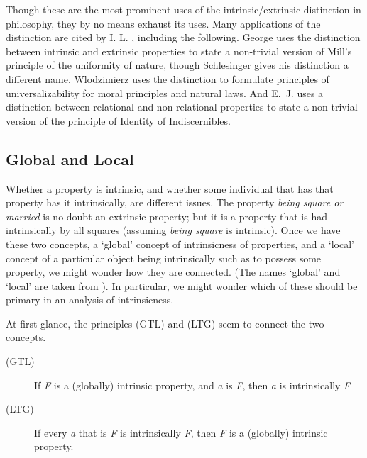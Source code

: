 Though these are the most prominent uses of the intrinsic/extrinsic distinction in philosophy, they by no means exhaust its uses. Many applications of the distinction are cited by I. L. \citet{Humberstone1996}, including the following. George \citet{Schlesinger1990} uses the distinction between intrinsic and extrinsic properties to state a non-trivial version of Mill's principle of the uniformity of nature, though Schlesinger gives his distinction a different name. Wlodzimierz \citet{Rabinowicz1979} uses the distinction to formulate principles of universalizability for moral principles and natural laws. And E.~J. \citet{Khamara1988} uses a distinction between relational and non-relational properties to state a non-trivial version of the principle of Identity of Indiscernibles.

\subsection{Global and Local}
Whether a property is intrinsic, and whether some individual that has that property has it intrinsically, are different issues. The property \textit{being square or married} is no doubt an extrinsic property; but it is a property that is had intrinsically by all squares (assuming \textit{being square} is intrinsic). Once we have these two concepts, a `global' concept of intrinsicness of properties, and a `local' concept of a particular object being intrinsically such as to possess some property, we might wonder how they are connected. (The names `global' and `local' are taken from \citet{Humberstone1996}). In particular, we might wonder which of these should be primary in an analysis of intrinsicness.

At first glance, the principles (GTL) and (LTG) seem to connect the two concepts.

\begin{description}
\item[(GTL)] If \textit{F} is a (globally) intrinsic property, and \textit{a} is \textit{F}, then \textit{a} is intrinsically \textit{F} 
\item[(LTG)] If every \textit{a} that is \textit{F} is intrinsically \textit{F}, then \textit{F} is a (globally) intrinsic property.
\end{description}

